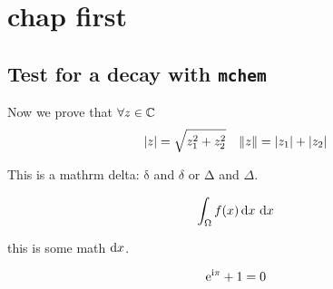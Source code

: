 \documentclass[
	fontsize=10pt,
	open=right,
	twoside,
    english,
    draft,
]{scrbook}
\title{}
\subtitle{}
\author{
  
}
\date{}
\begin{document}
%
\frontmatter
{}
	\maketitle
	\thispagestyle{empty}

	\cleardoublepage
{}
	

	\cleardoublepage
{}
	

	\cleardoublepage
{}
	

	\cleardoublepage
{}
	\tableofcontents

%
\mainmatter
\chapter{chap first}
\lipsum

\section{Test for a decay with \texttt{mchem}}

Now we prove that $\forall z \in \mathbb{C}$
\begin{equation*}
    \lvert z\rvert = \sqrt{z_1^2 + z_2^2}
    \quad
    \lVert z\rVert = \lvert z_1\rvert + \lvert z_2\rvert
\end{equation*}


This is a mathrm delta: $\mathrm{\delta}$ and $\delta$ or $\mathrm{\Delta}$ and $\Delta$.

\begin{equation}
    \int_{\Omega} f(x)\ud x\ \mathrm{d}x
\end{equation}

{\sffamily this is some math $\mathop{}\!\textup{d} x$.}

\begin{equation}
    \mathrm{e}^{\mathrm{i}\pi} + 1 = 0
\end{equation}
\end{document}
